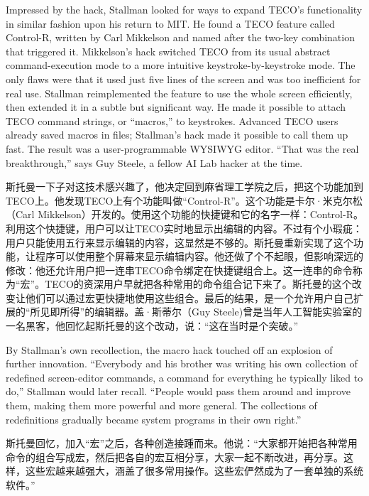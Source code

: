 \ifdefined\eng
Impressed by the hack, Stallman looked for ways to expand TECO's functionality in similar fashion upon his return to MIT. He found a TECO feature called Control-R, written by Carl Mikkelson and named after the two-key combination that triggered it. Mikkelson's hack switched TECO from its usual abstract command-execution mode to a more intuitive keystroke-by-keystroke mode. The only flaws were that it used just five lines of the screen and was too inefficient for real use. Stallman reimplemented the feature to use the whole screen efficiently, then
extended it in a subtle but significant way. He made it possible to attach TECO command strings, or ``macros,'' to keystrokes. Advanced TECO users already saved macros in files; Stallman's hack made it possible to call them up fast. The result was a user-programmable WYSIWYG editor. ``That was the real breakthrough,'' says Guy Steele, a fellow AI Lab hacker at the time.
\fi

\ifdefined\chs
斯托曼一下子对这技术感兴趣了，他决定回到麻省理工学院之后，把这个功能加到TECO上。他发现TECO上有个功能叫做``Control-R''。这个功能是卡尔·米克尔松（Carl Mikkelson）开发的。使用这个功能的快捷键和它的名字一样：Control-R。利用这个快捷键，用户可以让TECO实时地显示出编辑的内容。不过有个小瑕疵：用户只能使用五行来显示编辑的内容，这显然是不够的。斯托曼重新实现了这个功能，让程序可以使用整个屏幕来显示编辑内容。他还做了个不起眼，但影响深远的修改：他还允许用户把一连串TECO命令绑定在快捷键组合上。这一连串的命令称为``宏''。TECO的资深用户早就把各种常用的命令组合记下来了。斯托曼的这个改变让他们可以通过宏更快捷地使用这些组合。最后的结果，是一个允许用户自己扩展的``所见即所得''的编辑器。盖·斯蒂尔（Guy Steele)曾是当年人工智能实验室的一名黑客，他回忆起斯托曼的这个改动，说：``这在当时是个突破。''
\fi

\ifdefined\eng
By Stallman's own recollection, the macro hack touched off an explosion of further innovation. ``Everybody and his brother was writing his own collection of redefined screen-editor commands, a command for everything he typically liked to do,'' Stallman would later recall. ``People would pass them around and improve them, making them more powerful and more general. The collections of redefinitions gradually became system programs in their own right.''
\fi

\ifdefined\chs
斯托曼回忆，加入``宏''之后，各种创造接踵而来。他说：``大家都开始把各种常用命令的组合写成宏，然后把各自的宏互相分享，大家一起不断改进，再分享。这样，这些宏越来越强大，涵盖了很多常用操作。这些宏俨然成为了一套单独的系统软件。''
\fi

